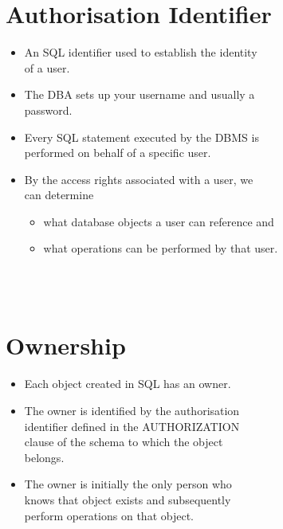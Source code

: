 \documentclass[12pt]{article}
\begin{document}
\begin{itemize}
\begin{itemize}
\begin{itemize}
\begin{itemize}
\begin{itemize}
\section{Authorisation Identifier}
\begin{itemize}
  \item An SQL identifier used to establish the identity \\ 
of a user.\\ 
  \item The DBA sets up your username and usually a \\ 
password.\\ 
  \item Every SQL statement executed by the DBMS is \\ 
performed on behalf of a specific user.\\ 
  \item By the access rights associated with a user, we \\ 
can determine \\ 
\begin{itemize}
  \item what database objects a user can reference and \\ 
  \item what operations can be performed by that user.\\ 
\end{itemize}
\end{itemize}
\\ 
 \\ 
\section{Ownership}
\begin{itemize}
  \item Each object created in SQL has an owner.\\ 
  \item The owner is identified by the authorisation \\ 
identifier defined in the AUTHORIZATION \\ 
clause of the schema to which the object \\ 
belongs.\\ 
  \item The owner is initially the only person who \\ 
knows that object exists and subsequently \\ 
perform operations on that object.\\ 
\end{itemize}
\\ 
 \\ 

\end{itemize}
\end{itemize}
\end{itemize}
\end{itemize}
\end{itemize}
\end{document}
